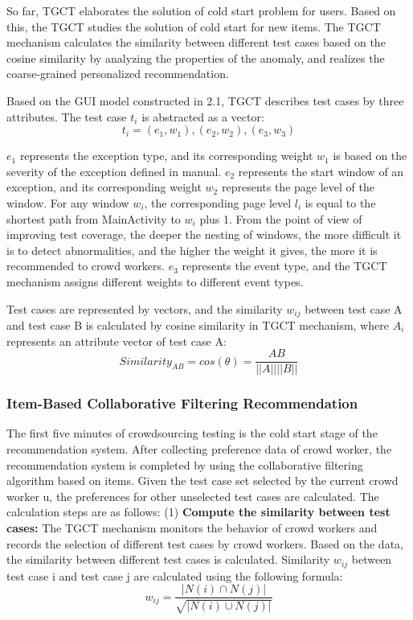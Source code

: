 So far, TGCT elaborates the solution of cold start problem for users. Based on this, the TGCT studies the solution of cold start for new items. The TGCT mechanism calculates the similarity between different test cases based on the cosine similarity by analyzing the properties of the anomaly, and realizes the coarse-grained personalized recommendation.

Based on the GUI model constructed in 2.1, TGCT describes test cases by three attributes. The test case $t_{i}$ is abstracted as a vector:
\begin{equation}
t_{i} = {(e_{1}, w_{1}),(e_{2}, w_{2}),(e_{3}, w_{3})}
\end{equation}

$e_{1}$ represents the exception type, and its corresponding weight $w_{1}$ is based on the severity of the exception defined in manual. $e_{2}$ represents the start window of an exception, and its corresponding weight $w_{2}$ represents the page level of the window. For any window $w_{i}$, the corresponding page level $l_{i}$ is equal to the shortest path from MainActivity to $w_{i}$ plus 1. From the point of view of improving test coverage, the deeper the nesting of windows, the more difficult it is to detect abnormalities, and the higher the weight it gives, the more it is recommended to crowd workers. $e_{3}$ represents the event type, and the TGCT mechanism assigns different weights to different event types.

Test cases are represented by vectors, and the similarity $w_{ij}$ between test case A and test case B is calculated by cosine similarity in TGCT mechanism, where $A_{i}$ represents an attribute vector of test case A:
\begin{equation}
Similarity_{AB} = cos(\theta) = \frac{AB}{||A||||B||}
\end{equation}

\subsubsection{Item-Based Collaborative Filtering Recommendation}
The first five minutes of crowdsourcing testing is the cold start stage of the recommendation system. After collecting preference data of crowd worker, the recommendation system is completed by using the collaborative filtering algorithm based on items. Given the test case set selected by the current crowd worker u, the preferences for other unselected test cases are calculated. The calculation steps are as follows: (1) \textbf{Compute the similarity between test cases:} The TGCT mechanism monitors the behavior of crowd workers and records the selection of different test cases by crowd workers. Based on the data, the similarity between different test cases is calculated. Similarity $w_{ij}$ between test case i and test case j are calculated using the following formula:
\begin{equation}
w_{ij} = \frac{|N(i) \cap N(j)|}{\sqrt{|N(i) \cup N(j)|}}
\end{equation}

